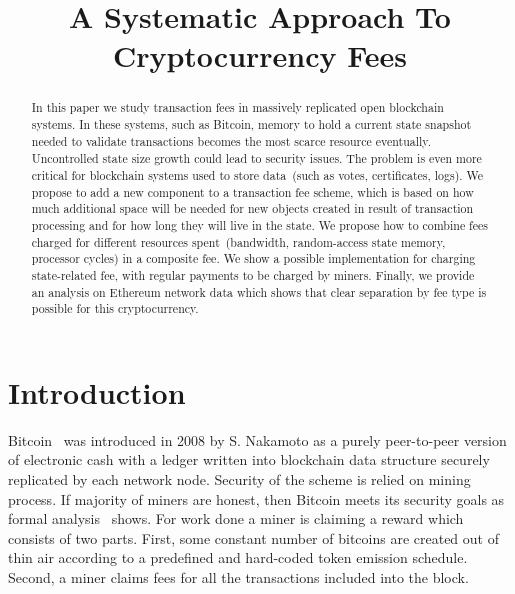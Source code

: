 \documentclass[]{llncs}   %
\newcommand{\authnote}[2]{\marginpar{\parbox{\marginparwidth}{\tiny %
  \textsf{#1 {\textcolor{blue}{notes: #2}}}}}%
  \textcolor{blue}{\textbf{\dag}}}
\newcommand{\authnote}[2]{
  \textsf{#1\textcolor{blue}{ #2}}}
\newcommand{\authnote}[2]{}
\newcommand{\knote}[1]{{\authnote{\textcolor{green}{Alex notes:}}{#1}}}
\newcommand{\dnote}[1]{{\authnote{\textcolor{red}{Dima notes:}}{#1}}}
\begin{document}
\title{A Systematic Approach To Cryptocurrency Fees}


\maketitle

\begin{abstract}

In this paper we study transaction fees in massively replicated open
blockchain systems. In these systems, such as Bitcoin, memory to hold a current
state snapshot needed to validate transactions becomes the most scarce resource \dnote{not the most, just one of}
eventually. Uncontrolled state size growth could lead
to security issues. 
The problem is even more critical for blockchain systems used to store
data~(such as votes, certificates, logs). We propose to add a new component to a transaction fee scheme, which is based on
how much additional space will be needed for new objects created in result of
transaction processing and for how long they will live in the state. We propose how to 
combine fees charged for different resources spent~(bandwidth, random-access state memory, processor cycles) 
in a composite fee. We show a possible implementation for charging state-related fee, with regular payments to be charged by miners.
Finally, we provide an analysis on Ethereum network data which shows that clear separation by fee type is possible for this cryptocurrency.


\end{abstract}

\section{Introduction}

Bitcoin~\cite{Nakamoto2008} was introduced in 2008 by S. Nakamoto as a purely
peer-to-peer version of electronic cash with a ledger written into blockchain
data structure securely replicated by each network node. Security of the scheme
is relied on mining process. If majority of miners are honest, then Bitcoin
meets its security goals as formal analysis~\cite{Garay2015} shows. For work
done a miner is claiming a reward which consists of two parts. First, some
constant number of bitcoins are created out of thin air according to a
predefined and hard-coded token emission schedule. Second, a miner claims fees
for all the transactions included into the block.
\end{document}

